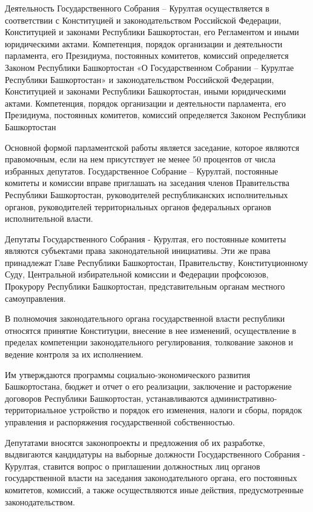Деятельность Государственного Собрания – Курултая осуществляется в соответствии с Конституцией и законодательством Российской Федерации, Конституцией и законами Республики Башкортостан, его Регламентом и иными юридическими актами. Компетенция, порядок организации и деятельности парламента, его Президиума, постоянных комитетов, комиссий определяется Законом Республики Башкортостан «О Государственном Собрании – Курултае Республики Башкортостан» и законодательством Российской Федерации, Конституцией и законами Республики Башкортостан, иными юридическими актами. Компетенция, порядок организации и деятельности парламента, его Президиума, постоянных комитетов, комиссий определяется Законом Республики Башкортостан

Основной формой парламентской работы является заседание, которое являются правомочным, если на нем присутствует не менее 50 процентов от числа избранных депутатов. Государственное Собрание – Курултай, постоянные комитеты и комиссии вправе приглашать на заседания членов Правительства Республики Башкортостан, руководителей республиканских исполнительных органов, руководителей территориальных органов федеральных органов исполнительной власти.

Депутаты Государственного Собрания - Курултая, его постоянные комитеты являются субъектами права законодательной инициативы. Эти же права принадлежат Главе Республики Башкортостан, Правительству, Конституционному Суду, Центральной избирательной комиссии и Федерации профсоюзов, Прокурору Республики Башкортостан, представительным органам местного самоуправления.

В полномочия законодательного органа государственной власти республики относятся принятие Конституции, внесение в нее изменений, осуществление в пределах компетенции законодательного регулирования, толкование законов и ведение контроля за их исполнением.

Им утверждаются программы социально-экономического развития Башкортостана, бюджет и отчет о его реализации, заключение и расторжение договоров Республики Башкортостан, устанавливаются административно-территориальное устройство и порядок его изменения, налоги и сборы, порядок управления и распоряжения государственной собственностью.

Депутатами вносятся законопроекты и предложения об их разработке, выдвигаются кандидатуры на выборные должности Государственного Собрания - Курултая, ставится вопрос о приглашении должностных лиц органов государственной власти на заседания законодательного органа, его постоянных комитетов, комиссий, а также осуществляются иные действия, предусмотренные законодательством.

